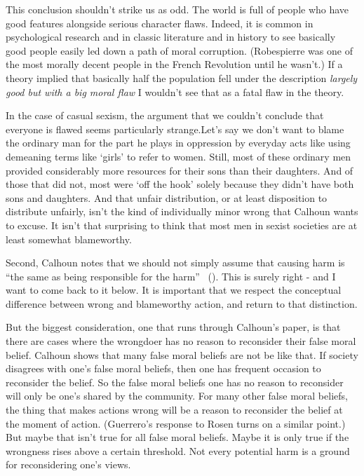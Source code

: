 \documentclass[
  10pt,
  letterpaper,
  twoside]{scrbook}
\begin{document}
This conclusion shouldn't strike us as odd. The world is full of people
who have good features alongside serious character flaws. Indeed, it is
common in psychological research and in classic literature and in
history to see basically good people easily led down a path of moral
corruption. (Robespierre was one of the most morally decent people in
the French Revolution until he wasn't.) If a theory implied that
basically half the population fell under the description \emph{largely
good but with a big moral flaw} I wouldn't see that as a fatal flaw in
the theory.

In the case of casual sexism, the argument that we couldn't conclude
that everyone is flawed seems particularly strange.Let's say we don't
want to blame the ordinary man for the part he plays in oppression by
everyday acts like using demeaning terms like `girls' to refer to women.
Still, most of these ordinary men provided considerably more resources
for their sons than their daughters. And of those that did not, most
were `off the hook' solely because they didn't have both sons and
daughters. And that unfair distribution, or at least disposition to
distribute unfairly, isn't the kind of individually minor wrong that
Calhoun wants to excuse. It isn't that surprising to think that most men
in sexist societies are at least somewhat blameworthy.

Second, Calhoun notes that we should not simply assume that causing harm
is ``the same as being responsible for the harm''
~(). This is surely right -
and I want to come back to it below. It is important that we respect the
conceptual difference between wrong and blameworthy action, and return
to that distinction.

But the biggest consideration, one that runs through Calhoun's paper, is
that there are cases where the wrongdoer has no reason to reconsider
their false moral belief. Calhoun shows that many false moral beliefs
are not be like that. If society disagrees with one's false moral
beliefs, then one has frequent occasion to reconsider the belief. So the
false moral beliefs one has no reason to reconsider will only be one's
shared by the community. For many other false moral beliefs, the thing
that makes actions wrong will be a reason to reconsider the belief at
the moment of action. (Guerrero's response to Rosen turns on a similar
point.) But maybe that isn't true for all false moral beliefs. Maybe it
is only true if the wrongness rises above a certain threshold. Not every
potential harm is a ground for reconsidering one's views.
\end{document}
